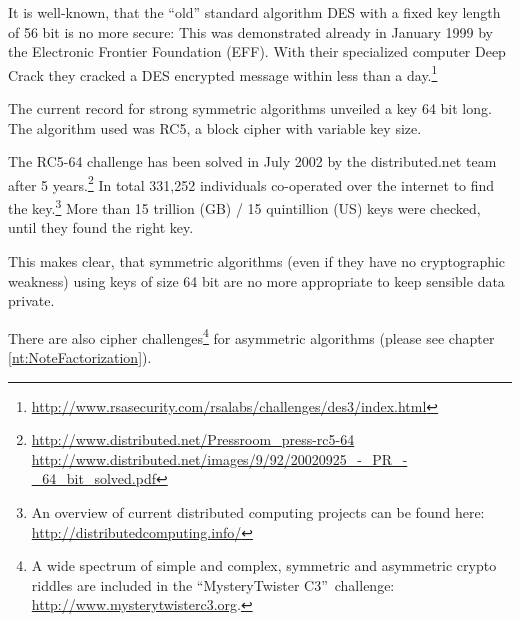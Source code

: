 It is well-known, that the ``old'' standard algorithm DES with a fixed key
length of 56 bit is no more secure: This was demonstrated already in January
1999 by the Electronic Frontier Foundation (EFF). With their specialized
computer Deep Crack they cracked a DES encrypted message within less than a
day.\footnote{%
 \url{http://www.rsasecurity.com/rsalabs/challenges/des3/index.html}
}

The current record for strong symmetric algorithms unveiled a key 64 bit long.
The algorithm used was RC5, a block cipher with variable key size. 

The RC5-64 challenge has been solved in July 2002 by the distributed.net team
after 5 years.\footnote{%
 \url{http://www.distributed.net/Pressroom_press-rc5-64}\\
 \url{http://www.distributed.net/images/9/92/20020925_-_PR_-_64_bit_solved.pdf}
}
In total 331,252 individuals co-operated over the internet to find the
key.\footnote{%
An overview of current distributed computing projects can be found here:\\
\url{http://distributedcomputing.info/}
}
More than 15 trillion (GB) / 15 quintillion (US)  keys were checked, until they
found the right key.

This makes clear, that symmetric algorithms (even if they have no
cryptographic weakness) using keys of size 64 bit are no more appropriate
to keep sensible data private.

There are also cipher challenges\footnote{%
  A wide spectrum of simple and complex, symmetric and asymmetric crypto riddles
  are included in the ``MysteryTwister C3''~challenge:
  \url{http://www.mysterytwisterc3.org}.
  }  for asymmetric algorithms (please see chapter \ref{nt:NoteFactorization}).



